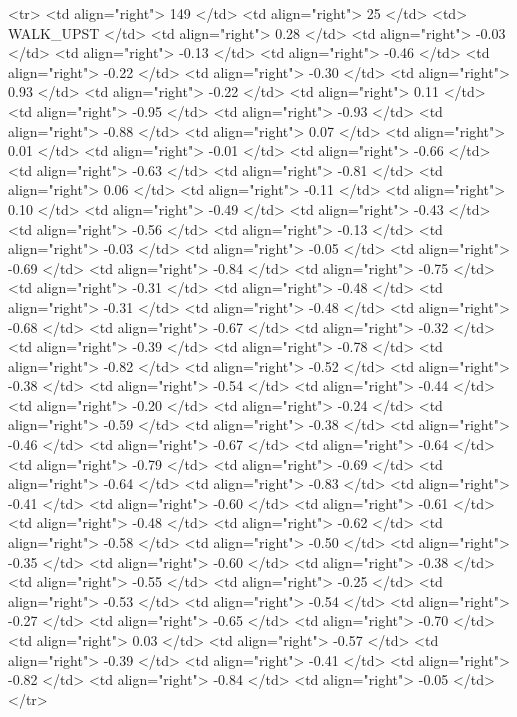   <tr> <td align="right"> 149 </td> <td align="right">  25 </td> <td> WALK_UPST </td> <td align="right"> 0.28 </td> <td align="right"> -0.03 </td> <td align="right"> -0.13 </td> <td align="right"> -0.46 </td> <td align="right"> -0.22 </td> <td align="right"> -0.30 </td> <td align="right"> 0.93 </td> <td align="right"> -0.22 </td> <td align="right"> 0.11 </td> <td align="right"> -0.95 </td> <td align="right"> -0.93 </td> <td align="right"> -0.88 </td> <td align="right"> 0.07 </td> <td align="right"> 0.01 </td> <td align="right"> -0.01 </td> <td align="right"> -0.66 </td> <td align="right"> -0.63 </td> <td align="right"> -0.81 </td> <td align="right"> 0.06 </td> <td align="right"> -0.11 </td> <td align="right"> 0.10 </td> <td align="right"> -0.49 </td> <td align="right"> -0.43 </td> <td align="right"> -0.56 </td> <td align="right"> -0.13 </td> <td align="right"> -0.03 </td> <td align="right"> -0.05 </td> <td align="right"> -0.69 </td> <td align="right"> -0.84 </td> <td align="right"> -0.75 </td> <td align="right"> -0.31 </td> <td align="right"> -0.48 </td> <td align="right"> -0.31 </td> <td align="right"> -0.48 </td> <td align="right"> -0.68 </td> <td align="right"> -0.67 </td> <td align="right"> -0.32 </td> <td align="right"> -0.39 </td> <td align="right"> -0.78 </td> <td align="right"> -0.82 </td> <td align="right"> -0.52 </td> <td align="right"> -0.38 </td> <td align="right"> -0.54 </td> <td align="right"> -0.44 </td> <td align="right"> -0.20 </td> <td align="right"> -0.24 </td> <td align="right"> -0.59 </td> <td align="right"> -0.38 </td> <td align="right"> -0.46 </td> <td align="right"> -0.67 </td> <td align="right"> -0.64 </td> <td align="right"> -0.79 </td> <td align="right"> -0.69 </td> <td align="right"> -0.64 </td> <td align="right"> -0.83 </td> <td align="right"> -0.41 </td> <td align="right"> -0.60 </td> <td align="right"> -0.61 </td> <td align="right"> -0.48 </td> <td align="right"> -0.62 </td> <td align="right"> -0.58 </td> <td align="right"> -0.50 </td> <td align="right"> -0.35 </td> <td align="right"> -0.60 </td> <td align="right"> -0.38 </td> <td align="right"> -0.55 </td> <td align="right"> -0.25 </td> <td align="right"> -0.53 </td> <td align="right"> -0.54 </td> <td align="right"> -0.27 </td> <td align="right"> -0.65 </td> <td align="right"> -0.70 </td> <td align="right"> 0.03 </td> <td align="right"> -0.57 </td> <td align="right"> -0.39 </td> <td align="right"> -0.41 </td> <td align="right"> -0.82 </td> <td align="right"> -0.84 </td> <td align="right"> -0.05 </td> </tr>
